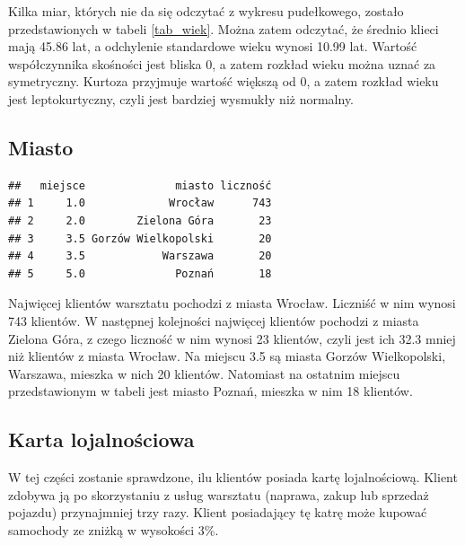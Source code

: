 \documentclass{article}\usepackage[]{graphicx}\usepackage[]{xcolor}
\makeatletter
\newenvironment{kframe}{%
 \def\at@end@of@kframe{}%
 \ifinner\ifhmode%
  \def\at@end@of@kframe{\end{minipage}}%
  \begin{minipage}{\columnwidth}%
 \fi\fi%
 \def\FrameCommand##1{\hskip\@totalleftmargin \hskip-\fboxsep
 \colorbox{shadecolor}{##1}\hskip-\fboxsep
     \hskip-\linewidth \hskip-\@totalleftmargin \hskip\columnwidth}%
 \MakeFramed {\advance\hsize-\width
   \@totalleftmargin\z@ \linewidth\hsize
   \@setminipage}}%
 {\par\unskip\endMakeFramed%
 \at@end@of@kframe}
\newenvironment{knitrout}{}{} %
\makeatother
\begin{document}
Kilka miar, których nie da się odczytać z wykresu pudełkowego, zostało przedstawionych w tabeli \ref{tab_wiek}. Można zatem odczytać, że średnio klieci mają 45.86 lat, a odchylenie standardowe wieku wynosi 10.99 lat. Wartość współczynnika skośności jest bliska 0, a zatem rozkład wieku można uznać za symetryczny. Kurtoza przyjmuje wartość większą od 0, a zatem rozkład wieku jest leptokurtyczny, czyli jest bardziej wysmukły niż normalny.

\subsection{Miasto}
\begin{knitrout}
\color{fgcolor}\begin{kframe}
\begin{verbatim}
##   miejsce              miasto liczność
## 1     1.0             Wrocław      743
## 2     2.0        Zielona Góra       23
## 3     3.5 Gorzów Wielkopolski       20
## 4     3.5            Warszawa       20
## 5     5.0              Poznań       18
\end{verbatim}
\end{kframe}
\end{knitrout}

Najwięcej klientów warsztatu pochodzi z miasta Wrocław. Liczniść w nim wynosi 743 klientów. W następnej kolejności najwięcej klientów pochodzi z miasta Zielona Góra, z czego liczność w nim wynosi 23 klientów, czyli jest ich 32.3 mniej niż klientów z miasta Wrocław. Na miejscu 3.5 są miasta Gorzów Wielkopolski, Warszawa, mieszka w nich 20 klientów. Natomiast na ostatnim miejscu przedstawionym w tabeli jest miasto Poznań, mieszka w nim 18 klientów.

\subsection{Karta lojalnościowa}

W tej części zostanie sprawdzone, ilu klientów posiada kartę lojalnościową. Klient zdobywa ją po skorzystaniu z usług warsztatu (naprawa, zakup lub sprzedaż pojazdu) przynajmniej trzy razy. Klient posiadający tę katrę może kupować samochody ze zniżką w wysokości 3\%.
\end{document}
